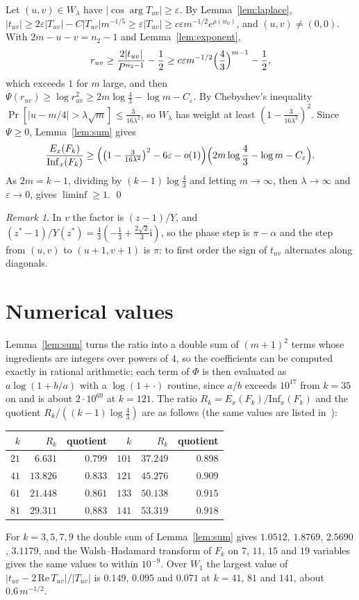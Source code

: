\documentclass[11pt]{amsart}
\theoremstyle{remark}
\newtheorem{remark}[theorem]{Remark}
\newcommand{\Inf}{\mathrm{Inf}}
\newcommand{\ii}{\mathrm{i}}
\begin{document}
Let $(u,v)\in W_\lambda$ have $|\cos\arg T_{uv}|\ge\varepsilon$. By Lemma~\ref{lem:laplace},
$|t_{uv}|\ge2\varepsilon|T_{uv}|-C|T_{uv}|m^{-1/5}\ge\varepsilon|T_{uv}|\ge c\varepsilon m^{-1/2}e^{\rho(w_0)}$, and
$(u,v)\ne(0,0)$. With $2m-u-v=n_2-1$ and Lemma~\ref{lem:exponent},
\[
r_{uv}\ge\frac{2|t_{uv}|}{P^{n_2-1}}-\frac12\ge c\varepsilon m^{-1/2}\Bigl(\frac43\Bigr)^{m-1}-\frac12,
\]
which exceeds $1$ for $m$ large, and then $\Psi(r_{uv})\ge\log r_{uv}^2\ge2m\log\frac43-\log m-C_\varepsilon$. By
Chebyshev's inequality $\Pr[|u-m/4|>\lambda\sqrt m]\le\frac{3}{16\lambda^2}$, so $W_\lambda$ has weight at least
$(1-\frac3{16\lambda^2})^2$. Since $\Psi\ge0$, Lemma~\ref{lem:sum} gives
\[
\frac{E_x(F_k)}{\Inf_x(F_k)}\ge\Bigl(\bigl(1-\tfrac3{16\lambda^2}\bigr)^2-6\varepsilon-o(1)\Bigr)\Bigl(2m\log\frac43-\log
m-C_\varepsilon\Bigr).
\]
As $2m=k-1$, dividing by $(k-1)\log\frac43$ and letting $m\to\infty$, then $\lambda\to\infty$ and $\varepsilon\to0$,
gives $\liminf\ge1$. \qed

\begin{remark}
In $v$ the factor is $(z-1)/Y$, and $(z^*-1)/Y(z^*)=\frac43(-\frac13+\frac{2\sqrt2}3\ii)$, so the phase step is
$\pi-\alpha$ and the step from $(u,v)$ to $(u+1,v+1)$ is $\pi$: to first order the sign of $t_{uv}$ alternates along
diagonals.
\end{remark}

\section{Numerical values}\label{sec:num}

Lemma~\ref{lem:sum} turns the ratio into a double sum of $(m+1)^2$ terms whose ingredients are integers over powers of
$4$, so the coefficients can be computed exactly in rational arithmetic; each term of $\Phi$ is then evaluated as
$a\log(1+b/a)$ with a $\log(1+\cdot)$ routine, since $a/b$ exceeds $10^{17}$ from $k=35$ on and is about $2\cdot10^{69}$ at $k=121$. The ratio $R_k=E_x(F_k)/\Inf_x(F_k)$ and the quotient
$R_k/((k-1)\log\frac43)$ are as follows (the same values are listed in~\cite[Section~5]{Shm8}):
\begin{center}
\begin{tabular}{rrr@{\qquad}rrr}
\toprule
$k$ & $R_k$ & quotient & $k$ & $R_k$ & quotient\\ \midrule
$21$ & $6.631$ & $0.799$ & $101$ & $37.249$ & $0.898$\\
$41$ & $13.826$ & $0.833$ & $121$ & $45.276$ & $0.909$\\
$61$ & $21.448$ & $0.861$ & $133$ & $50.138$ & $0.915$\\
$81$ & $29.311$ & $0.883$ & $141$ & $53.319$ & $0.918$\\
\bottomrule
\end{tabular}
\end{center}
For $k=3,5,7,9$ the double sum of Lemma~\ref{lem:sum} gives $1.0512$, $1.8769$, $2.5690$, $3.1179$, and the
Walsh--Hadamard transform of $F_k$ on $7$, $11$, $15$ and $19$ variables gives the same values to within $10^{-9}$.
Over $W_1$ the largest value of $|t_{uv}-2\,\mathrm{Re}\,T_{uv}|/|T_{uv}|$ is $0.149$, $0.095$ and $0.071$ at $k=41$,
$81$ and $141$, about $0.6\,m^{-1/2}$.
\end{document}
